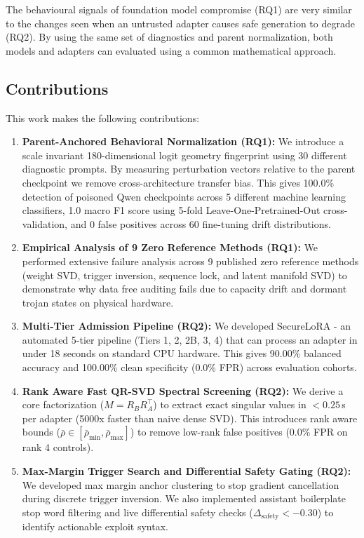 The behavioural signals of foundation model compromise (RQ1) are very similar to the changes seen when an untrusted adapter causes safe generation to degrade (RQ2). By using the same set of diagnostics and parent normalization, both models and adapters can evaluated using a common mathematical approach.

\subsection{Contributions}
This work makes the following contributions:
\begin{enumerate}
    \item \textbf{Parent-Anchored Behavioral Normalization (RQ1):} We introduce a scale invariant 180-dimensional logit geometry fingerprint using 30 different diagnostic prompts. By measuring perturbation vectors relative to the parent checkpoint we remove cross-architecture transfer bias. This gives 100.0\% detection of poisoned Qwen checkpoints across 5 different machine learning classifiers, 1.0 macro F1 score using 5-fold Leave-One-Pretrained-Out cross-validation, and 0 false positives across 60 fine-tuning drift distributions.
    \item \textbf{Empirical Analysis of 9 Zero Reference Methods (RQ1):} We performed extensive failure analysis across 9 published zero reference methods (weight SVD, trigger inversion, sequence lock, and latent manifold SVD) to demonstrate why data free auditing fails due to capacity drift and dormant trojan states on physical hardware.
    \item \textbf{Multi-Tier Admission Pipeline (RQ2):} We developed SecureLoRA - an automated 5-tier pipeline (Tiers 1, 2, 2B, 3, 4) that can process an adapter in under 18 seconds on standard CPU hardware. This gives 90.00\% balanced accuracy and 100.00\% clean specificity (0.0\% FPR) across evaluation cohorts.
    \item \textbf{Rank Aware Fast QR-SVD Spectral Screening (RQ2):} We derive a core factorization ($M = R_B R_A^\top$) to extract exact singular values in $< 0.25$\,s per adapter (5000x faster than naive dense SVD). This introduces rank aware bounds ($\bar{\rho} \in [\bar{\rho}_{\min}, \bar{\rho}_{\max}]$) to remove low-rank false positives (0.0\% FPR on rank 4 controls).
    \item \textbf{Max-Margin Trigger Search and Differential Safety Gating (RQ2):} We developed max margin anchor clustering to stop gradient cancellation during discrete trigger inversion. We also implemented assistant boilerplate stop word filtering and live differential safety checks ($\Delta_{\text{safety}} < -0.30$) to identify actionable exploit syntax.

\end{enumerate}
